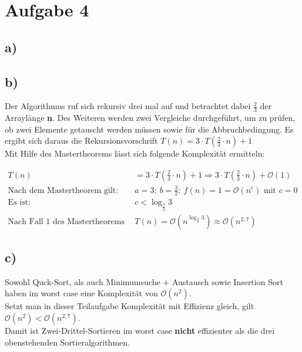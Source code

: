 \documentclass[a4paper]{scrartcl}
\begin{document}
\section*{Aufgabe 4}
\subsection*{a)}
\subsection*{b)}
Der Algorithmus ruf sich rekursiv drei mal auf und betrachtet dabei $\frac{2}{3}$ der Arraylänge \textbf{n}. Des Weiteren werden zwei Vergleiche durchgeführt, um zu prüfen, ob zwei Elemente getauscht werden müssen sowie für die Abbruchbedingung. Es ergibt sich daraus die Rekursionsvorschrift $T(n) = 3 \cdot T\left(\frac{2}{3} \cdot n\right) + 1$ \\
Mit Hilfe des Mastertheorems lässt sich folgende Komplexität ermitteln:

\begin{align*}
T(n) &= 3 \cdot T\left( \frac{2}{3} \cdot n \right) + 1 \Rightarrow 3 \cdot T\left(\frac{2}{3} \cdot n\right) + \mathcal{O}(1) \\
\text{Nach dem Mastertheorem gilt: } &a = 3; ~ b = \frac{3}{2}; ~ f(n) = 1 = \mathcal{O}(n^c) \text{ mit } c = 0 \\
\text{Es ist: } &c < \log_{\frac{3}{2}} 3 \\
\text{Nach Fall 1 des Mastertheorems gilt: } &T(n) = \mathcal{O}(n^{\log_{\frac{3}{2}} 3}) \approx \mathcal{O}(n^{2,7})
\end{align*}

\subsection*{c)}
Sowohl Quck-Sort, als auch Minimumsuche $+$ Austausch sowie Insertion Sort haben im worst case eine Komplexität von $\mathcal{O}(n^{2})$. \\
Setzt man in dieser Teilaufgabe Komplexität mit Effizienz gleich, gilt $\mathcal{O}(n^{2}) < \mathcal{O}(n^{2,7})$. \\
Damit ist Zwei-Drittel-Sortieren im worst case \textbf{nicht} effizienter als die drei obenstehenden Sortieralgorithmen.
\end{document}
